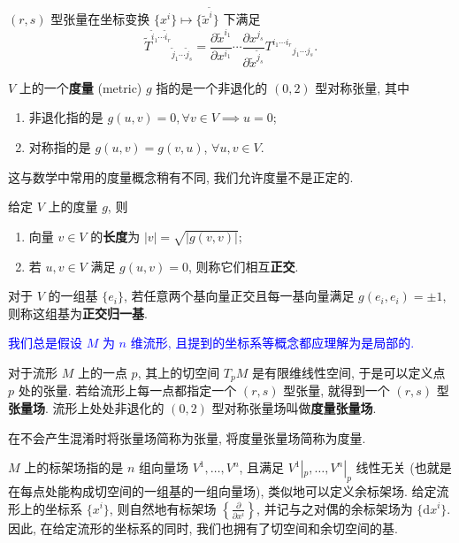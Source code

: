 \begin{theorem}
\label{coordinate transform}
    $ (r,s) $ 型张量在坐标变换 $\{x^i\}\mapsto\{\tilde{x}^{\tilde{i}}\}$ 下满足
    \[ \tilde{T}^{\tilde{i}_1\cdots\tilde{i}_r}{}_{\tilde{j}_1\cdots\tilde{j}_s}=\frac{\partial \tilde{x}^{i_1}}{\partial x^{i_1}}\cdots\frac{\partial x^{j_s}}{\partial \tilde{x}^{\tilde{j}_s}}T^{i_1\cdots i_r}{}_{j_1\cdots j_s}. \]
\end{theorem}

\begin{definition}[度量]
\label{metric}
    $ V $ 上的一个{\bf 度量} (metric) $ g $ 指的是一个非退化的 $ (0,2) $ 型对称张量, 其中
    \begin{enumerate}
		\item 非退化指的是 $ g(u,v)=0, \forall v\in V \implies u=0$;
        \item 对称指的是 $ g(u,v)=g(v,u) $, $ \forall u,v\in V $.
    \end{enumerate}
\end{definition}
\begin{remark}
    这与数学中常用的度量概念稍有不同, 我们允许度量不是正定的.
\end{remark}

\begin{definition}[正规正交基]
    给定 $ V $ 上的度量 $ g $, 则
	\begin{enumerate}
		\item 向量 $ v\in V $ 的{\bf 长度}为 $ |v|=\sqrt{|g(v,v)|} $;
		\item 若 $u,v\in V$ 满足 $ g(u,v)=0 $, 则称它们相互{\bf 正交}.
	\end{enumerate}
	对于 $ V $ 的一组基 $ \{e_i\} $, 若任意两个基向量正交且每一基向量满足 $ g(e_i,e_i)=\pm 1 $, 则称这组基为{\bf 正交归一基}.
\end{definition}

\textcolor{blue}{我们总是假设 $M$ 为 $n$ 维流形, 且提到的坐标系等概念都应理解为是局部的.}

对于流形 $M$ 上的一点 $p$, 其上的切空间 $T_pM$ 是有限维线性空间, 于是可以定义点 $p$ 处的张量. 若给流形上每一点都指定一个 $(r,s)$ 型张量, 就得到一个 $(r,s)$ 型{\bf 张量场}. 流形上处处非退化的 $ (0,2) $ 型对称张量场叫做{\bf 度量张量场}.
\begin{remark}
	在不会产生混淆时将张量场简称为张量, 将度量张量场简称为度量.
\end{remark}

$M$ 上的标架场指的是 $n$ 组向量场 $V^1,\dots,V^n$, 且满足 $V^1|_p,\dots,V^n|_p$ 线性无关 (也就是在每点处能构成切空间的一组基的一组向量场), 类似地可以定义余标架场. 给定流形上的坐标系 $\{x^i\}$, 则自然地有标架场 $\displaystyle \left\{ \frac{\partial}{\partial x^i} \right\}$, 并记与之对偶的余标架场为 $\{\mathrm{d}x^i\}$. 因此, 在给定流形的坐标系的同时, 我们也拥有了切空间和余切空间的基. 

